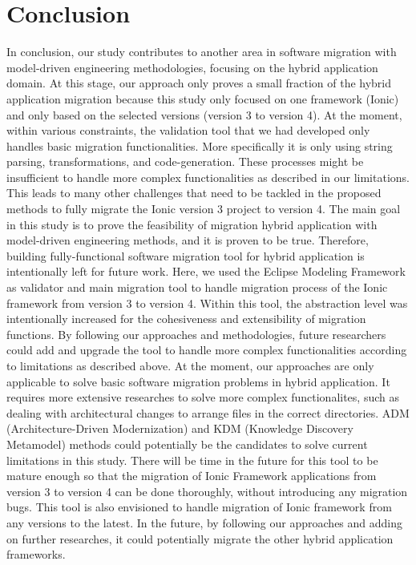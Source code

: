 \documentclass[conference]{IEEEtran}
\begin{document}
\section{Conclusion}
In conclusion, our study contributes to another area in software migration with
model-driven engineering methodologies, focusing on the hybrid application domain.
At this stage, our approach only proves a small fraction of the hybrid application migration because
this study only focused on one framework (Ionic) and only based on the selected versions (version 3 to version 4).
\newline \newline
At the moment, within various constraints, the validation tool that we had developed only handles basic migration functionalities.
More specifically it is only using string parsing, transformations, and code-generation. These processes might
be insufficient to handle more complex functionalities as described in our limitations.
\newline \newline
This leads to many other challenges that need to be tackled in the proposed methods to fully migrate the Ionic version 3 project
to version 4. The main goal in this study is to prove the feasibility of migration hybrid application with model-driven engineering
methods, and it is proven to be true. Therefore, building fully-functional software migration tool for hybrid application is intentionally
left for future work.
\newline \newline
Here, we used the Eclipse Modeling Framework as validator and main migration tool to handle migration process of
the Ionic framework from version 3 to version 4. Within this tool, the abstraction level was intentionally
increased for the cohesiveness and extensibility of migration functions. By following our approaches and methodologies,
future researchers could add and upgrade the tool to handle more complex functionalities according
to limitations as described above.
\newline \newline
At the moment, our approaches are only applicable to solve basic software migration problems in hybrid application.
It requires more extensive researches to solve more complex functionalites, such as dealing with
architectural changes to arrange files in the correct directories. ADM (Architecture-Driven Modernization) and
KDM (Knowledge Discovery Metamodel) methods \cite{b6} \cite{b10} could potentially be the candidates to solve
current limitations in this study.
\newline \newline
There will be time in the future for this tool to be mature enough so that the migration of Ionic Framework applications
from version  3 to version 4 can be done thoroughly, without introducing any migration bugs.
This tool is also envisioned to handle migration of Ionic framework from
any versions to the latest. In the future, by following our approaches and adding on further researches,
it could potentially migrate the other hybrid application frameworks.
\end{document}
